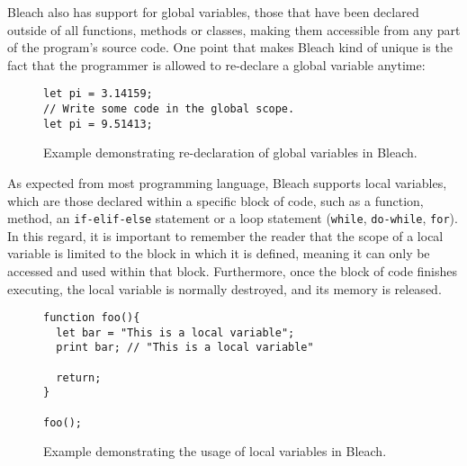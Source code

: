 Bleach also has support for global variables, those that have been declared outside of all functions, methods or classes, making them accessible from any part of the program's source code. One point that makes Bleach kind of unique is the fact that the programmer is allowed to re-declare a global variable anytime:
\begin{figure}[H]
    \centering
    \begin{lstlisting}
let pi = 3.14159;
// Write some code in the global scope.
let pi = 9.51413;
    \end{lstlisting}
    \caption{Example demonstrating re-declaration of global variables in Bleach.}
\end{figure}

As expected from most programming language, Bleach supports local variables, which are those declared within a specific block of code, such as a function, method, an \texttt{if-elif-else} statement or a loop statement (\texttt{while}, \texttt{do-while}, \texttt{for}). In this regard, it is important to remember the reader that the scope of a local variable is limited to the block in which it is defined, meaning it can only be accessed and used within that block. Furthermore, once the block of code finishes executing, the local variable is normally destroyed, and its memory is released.
\begin{figure}[H]
    \centering
    \begin{lstlisting}
function foo(){
  let bar = "This is a local variable";
  print bar; // "This is a local variable"

  return;
}

foo();
    \end{lstlisting}
    \caption{Example demonstrating the usage of local variables in Bleach.}
\end{figure}

